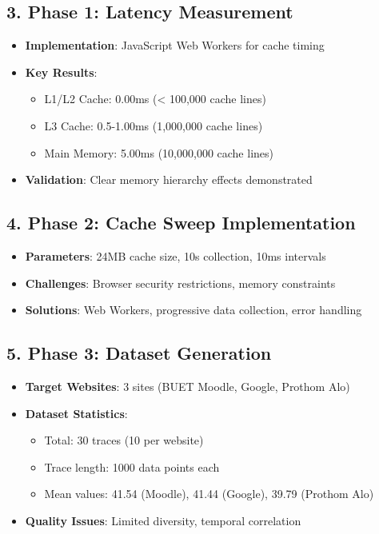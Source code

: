 \documentclass[11pt,a4paper]{article}
\begin{document}
\subsection{3. Phase 1: Latency Measurement}
\begin{itemize}[leftmargin=*]
    \item \textbf{Implementation}: JavaScript Web Workers for cache timing
    \item \textbf{Key Results}:
    \begin{itemize}
        \item L1/L2 Cache: 0.00ms (< 100,000 cache lines)
        \item L3 Cache: 0.5-1.00ms (1,000,000 cache lines)
        \item Main Memory: 5.00ms (10,000,000 cache lines)
    \end{itemize}
    \item \textbf{Validation}: Clear memory hierarchy effects demonstrated
\end{itemize}

\subsection{4. Phase 2: Cache Sweep Implementation}
\begin{itemize}[leftmargin=*]
    \item \textbf{Parameters}: 24MB cache size, 10s collection, 10ms intervals
    \item \textbf{Challenges}: Browser security restrictions, memory constraints
    \item \textbf{Solutions}: Web Workers, progressive data collection, error handling
\end{itemize}

\subsection{5. Phase 3: Dataset Generation}
\begin{itemize}[leftmargin=*]
    \item \textbf{Target Websites}: 3 sites (BUET Moodle, Google, Prothom Alo)
    \item \textbf{Dataset Statistics}:
    \begin{itemize}
        \item Total: 30 traces (10 per website)
        \item Trace length: 1000 data points each
        \item Mean values: 41.54 (Moodle), 41.44 (Google), 39.79 (Prothom Alo)
    \end{itemize}
    \item \textbf{Quality Issues}: Limited diversity, temporal correlation
\end{itemize}
\end{document}
